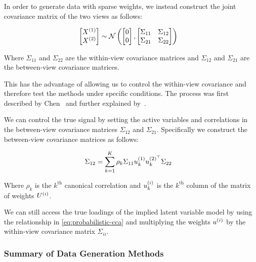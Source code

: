 In order to generate data with sparse weights, we instead construct the joint covariance matrix\citep{mai2019iterative,chen2013sparse} of the two views as follows:

\begin{align}\label{eq:covariance}
    \begin{bmatrix} X^{(1)} \\ X^{(2)} \end{bmatrix} \sim \mathcal{N} \left( \begin{bmatrix} 0 \\ 0 \end{bmatrix}, \begin{bmatrix} \Sigma_{11} & \Sigma_{12} \\ \Sigma_{21} & \Sigma_{22} \end{bmatrix} \right)
\end{align}

Where $\Sigma_{11}$ and $\Sigma_{22}$ are the within-view covariance matrices and $\Sigma_{12}$ and $\Sigma_{21}$ are the between-view covariance matrices.

This has the advantage of allowing us to control the within-view covariance and therefore test the methods under specific conditions.
The process was first described by Chen~\cite{chen2013sparse} and further explained by~\cite{suo2017sparse}.

We can control the true signal by setting the active variables and correlations in the between-view covariance matrices $\Sigma_{12}$ and $\Sigma_{21}$.
Specifically we construct the between-view covariance matrices as follows:

\begin{align}
    \Sigma_{12}=\sum_{k=1}^{K}\rho_k\Sigma_{11}u^{(1)}_{k}u^{(2)^{\top}}_k\Sigma_{22}
\end{align}

Where $\rho_k$ is the $k^{\text{th}}$ canonical correlation and $u^{(i)}_k$ is the $k^{\text{th}}$ column of the matrix of weights $U^{(i)}$.

We can still access the true loadings of the implied latent variable model by using the relationship in \ref{eq:probabilistic-cca} and multiplying the weights $u^{(i)}$ by the within-view covariance matrix $\Sigma_{ii}$.

\subsubsection{Summary of Data Generation Methods}


